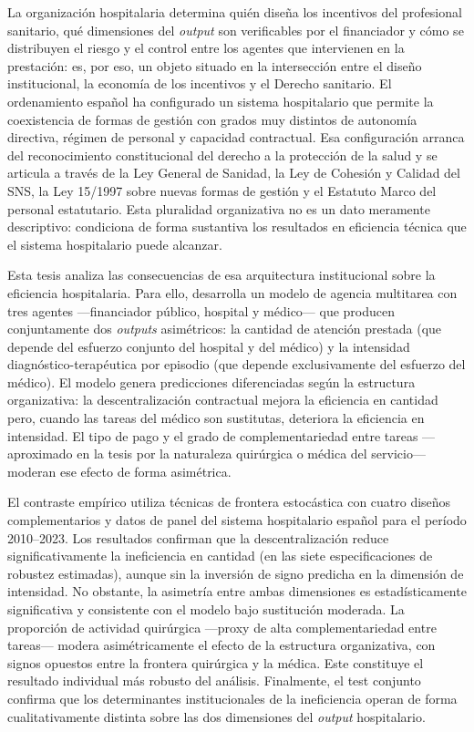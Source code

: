 La organización hospitalaria determina quién diseña los incentivos 
del profesional sanitario, qué dimensiones del \textit{output} son 
verificables por el financiador y cómo se distribuyen el riesgo y 
el control entre los agentes que intervienen en la prestación: es, 
por eso, un objeto situado en la intersección entre el diseño 
institucional, la economía de los incentivos y el Derecho sanitario. 
El ordenamiento español ha configurado un sistema hospitalario que 
permite la coexistencia de formas de gestión con grados muy distintos 
de autonomía directiva, régimen de personal y capacidad contractual. 
Esa configuración arranca del reconocimiento constitucional del derecho 
a la protección de la salud y se articula a través de la Ley General 
de Sanidad, la Ley de Cohesión y Calidad del SNS, la Ley 15/1997 
sobre nuevas formas de gestión y el Estatuto Marco del personal 
estatutario. Esta pluralidad organizativa no es un dato meramente 
descriptivo: condiciona de forma sustantiva los resultados en 
eficiencia técnica que el sistema hospitalario puede alcanzar.

Esta tesis analiza las consecuencias de esa arquitectura institucional 
sobre la eficiencia hospitalaria. Para ello, desarrolla un modelo de 
agencia multitarea con tres agentes ---financiador público, hospital 
y médico--- que producen conjuntamente dos \textit{outputs} asimétricos: 
la cantidad de atención prestada (que depende del esfuerzo conjunto 
del hospital y del médico) y la intensidad diagnóstico-terapéutica 
por episodio (que depende exclusivamente del esfuerzo del médico). 
El modelo genera predicciones diferenciadas según la estructura 
organizativa: la descentralización contractual mejora la eficiencia 
en cantidad pero, cuando las tareas del médico son sustitutas, 
deteriora la eficiencia en intensidad. El tipo de pago y el grado 
de complementariedad entre tareas ---aproximado en la tesis por la 
naturaleza quirúrgica o médica del servicio--- moderan ese efecto 
de forma asimétrica.

El contraste empírico utiliza técnicas de frontera estocástica con 
cuatro diseños complementarios y datos de panel del sistema hospitalario 
español para el período 2010--2023. Los resultados confirman que la 
descentralización reduce significativamente la ineficiencia en cantidad 
(en las siete especificaciones de robustez estimadas), aunque sin la 
inversión de signo predicha en la dimensión de intensidad. No obstante, 
la asimetría entre ambas dimensiones es estadísticamente significativa 
y consistente con el modelo bajo sustitución moderada. La proporción 
de actividad quirúrgica ---proxy de alta complementariedad entre 
tareas--- modera asimétricamente el efecto de la estructura 
organizativa, con signos opuestos entre la frontera quirúrgica y la 
médica. Este constituye el resultado individual más robusto del 
análisis. Finalmente, el test conjunto confirma que los determinantes 
institucionales de la ineficiencia operan de forma cualitativamente 
distinta sobre las dos dimensiones del \textit{output} hospitalario.

